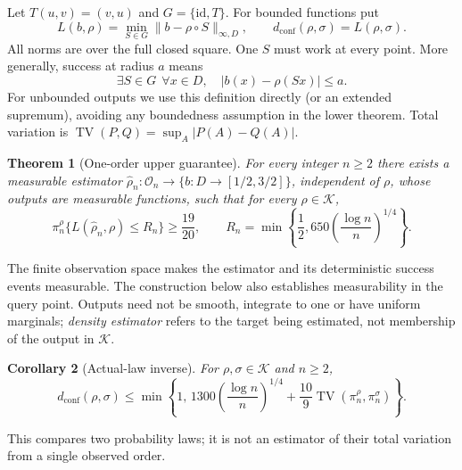 \documentclass[11pt]{article}
\newtheorem{theorem}{Theorem}[section]
\newtheorem{corollary}[theorem]{Corollary}
\theoremstyle{remark}
\newcommand{\K}{\mathcal K}
\newcommand{\TV}{\operatorname{TV}}
\newcommand{\dc}{d_{\mathrm{conf}}}
\newcommand{\norm}[1]{\lVert #1\rVert_{\infty,D}}
\begin{document}
Let $T(u,v)=(v,u)$ and $G=\{\mathrm{id},T\}$. For bounded functions put
\[
 L(b,\rho)=\min_{S\in G}\norm{b-\rho\circ S},\qquad
 \dc(\rho,\sigma)=L(\rho,\sigma).
\]
All norms are over the full closed square. One $S$ must work at every
point. More generally, success at radius $a$ means
\begin{equation}\label{eq:success}
 \exists S\in G\ \ \forall x\in D,\quad |b(x)-\rho(Sx)|\le a.
\end{equation}
For unbounded outputs we use this definition directly (or an extended
supremum), avoiding any boundedness assumption in the lower theorem.
Total variation is $\TV(P,Q)=\sup_A|P(A)-Q(A)|$.

\begin{theorem}[One-order upper guarantee]\label{thm:upper}
For every integer $n\ge2$ there exists a measurable estimator
$\widehat\rho_n:\mathcal O_n\to\{b:D\to[1/2,3/2]\}$, independent of
$\rho$, whose outputs are measurable functions, such that for every
$\rho\in\K$,
\begin{equation}\label{eq:upper}
 \pi_n^\rho\{L(\widehat\rho_n,\rho)\le R_n\}\ge\frac{19}{20},
 \qquad R_n=\min\left\{\frac12,650\left(\frac{\log n}{n}\right)^{1/4}\right\}.
\end{equation}
\end{theorem}
The finite observation space makes the estimator and its deterministic
success events measurable. The construction below also establishes
measurability in the query point. Outputs need not be smooth, integrate
to one or have uniform marginals; \emph{density estimator} refers to the
target being estimated, not membership of the output in $\K$.

\begin{corollary}[Actual-law inverse]\label{cor:law}
For $\rho,\sigma\in\K$ and $n\ge2$,
\begin{equation}\label{eq:law}
 \dc(\rho,\sigma)\le
 \min\left\{1,\,
 1300\left(\frac{\log n}{n}\right)^{1/4}
       +\frac{10}{9}\TV(\pi_n^\rho,\pi_n^\sigma)\right\}.
\end{equation}
\end{corollary}
This compares two probability laws; it is not an estimator of their
total variation from a single observed order.
\end{document}
